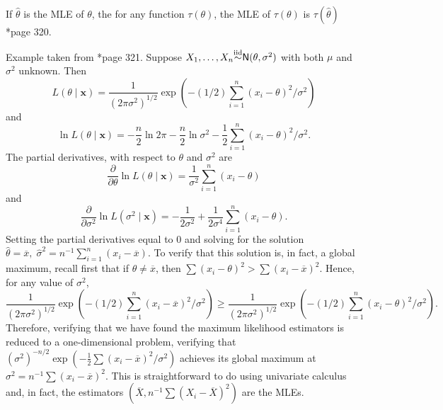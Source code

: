 \begin{thm} \label{thm: invariance_of_mles}
    If $\hat{\theta}$ is the MLE of $\theta$, the for any function $\tau (\theta)$, the MLE of $\tau (\theta)$ is $\tau (\hat{\theta})$ \cite{CasellaGeorge2001SI}*{page 320}.
\end{thm}

\begin{exam} \label{exam: normal_mle_mu_sigma}
    Example taken from \cite{CasellaGeorge2001SI}*{page 321}. Suppose $X_1, \ldots , X_n {\overset{\text{iid}}{\sim}} {\sf N} (\theta , \sigma^2)$ with both $\mu$ and $\sigma^2$ unknown. Then
    \begin{equation*}
        L(\theta \mid \bm{x}) = \frac{1}{(2 \pi \sigma^2)^{1/2}} \exp \left( -(1/2) \sum_{i=1}^{n} (x_i - \theta)^2 / \sigma^2 \right)
    \end{equation*}
    and
    \begin{equation*}
        \ln L(\theta \mid \bm{x}) = -\frac{n}{2} \ln 2 \pi - \frac{n}{2} \ln \sigma^2 - \frac{1}{2} \sum_{i=1}^{n} (x_i - \theta)^2 / \sigma^2 .
    \end{equation*}
    The partial derivatives, with respect to $\theta$ and $\sigma^2$ are
    \begin{equation*}
        \frac{\partial}{\partial \theta} \ln L(\theta \mid \bm{x}) = \frac{1}{\sigma^2} \sum_{i=1}^{n} (x_i - \theta)
    \end{equation*}
    and
    \begin{equation*}
        \frac{\partial}{\partial \sigma^2} \ln L(\sigma^2 \mid \bm{x}) = - \frac{1}{2\sigma^2} + \frac{1}{2 \sigma^4} \sum_{i=1}^{n} (x_i - \theta).
    \end{equation*}
    Setting the partial derivatives equal to $0$ and solving for the solution $\hat{\theta} = \overline{x}, \; \hat{\sigma}^2 = n^{-1} \sum_{i=1}^{n} (x_i - \overline{x})$. To verify that this solution is, in fact, a global maximum, recall first that if $\theta \neq \overline{x}$, then $\sum (x_i - \theta)^2 > \sum (x_i - \overline{x})^2$. Hence, for any value of $\sigma^2$,
    \begin{equation*}
        \frac{1}{(2 \pi \sigma^2)^{1/2}} \exp \left( -(1/2) \sum_{i=1}^{n} (x_i - \overline{x})^2 / \sigma^2 \right) \geq \frac{1}{(2 \pi \sigma^2)^{1/2}} \exp \left( -(1/2) \sum_{i=1}^{n} (x_i - \theta)^2 / \sigma^2 \right) .
    \end{equation*}
    Therefore, verifying that we have found the maximum likelihood estimators is reduced to a one-dimensional problem, verifying that $(\sigma^2)^{-n/2} \exp \left( -\frac{1}{2} \sum (x_i - \overline{x})^2 / \sigma^2 \right)$ achieves its global maximum at $\sigma^2 = n^{-1} \sum (x_i - \overline{x})^2$. This is straightforward to do using univariate calculus and, in fact, the estimators $\left( \overline{X} , n^{-1} \sum \left( X_i - \overline{X} \right)^2 \right)$ are the MLEs.
\end{exam}

